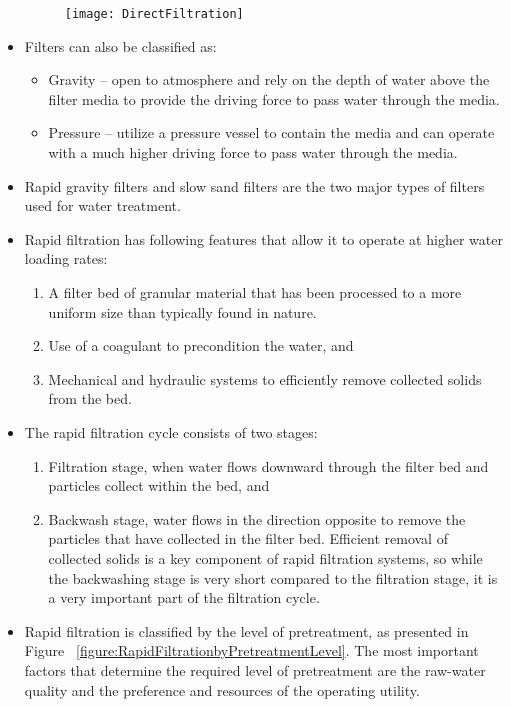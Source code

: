 \begin{itemize}
\begin{figure}[H]
\begin{center}
\texttt{[image: DirectFiltration]}\\
\label{Direct filtration}
\end{center}
\end{figure}
\item Filters can also be classified as:
\begin{itemize}
\item Gravity – open to atmosphere and rely on the depth of water above the filter media to provide
the driving force to pass water through the media.
\item Pressure – utilize a pressure vessel to contain the media and can operate with a much higher driving force to pass water through the media.
\end{itemize}
\item Rapid gravity filters and slow sand filters are the two major types of filters used for water treatment.

\item Rapid filtration has following features that allow it to operate at higher water loading rates:
\begin{enumerate}
\item A filter bed of granular material that has been processed to a more uniform size than typically found in nature.
\item Use of a coagulant to precondition the water, and
\item Mechanical and hydraulic systems to efficiently remove collected solids from the bed.
\end{enumerate}
\item The rapid filtration
cycle consists of two stages: 
\begin{enumerate}
\item Filtration stage, when water flows downward through the filter bed and particles collect within the bed, and 
\item Backwash stage, water flows in the direction opposite to remove the particles that have collected in the filter bed. Efficient removal of collected solids is a key component of rapid filtration systems, so while the backwashing stage is very short compared to the filtration stage, it is a very important part of the filtration cycle.
\end{enumerate}

\item Rapid filtration is classified by the level of pretreatment, as presented in Figure ~\ref{figure:RapidFiltrationbyPretreatmentLevel}. The most important factors that determine the required level of pretreatment are the raw-water quality and the preference and resources of the operating utility.


\end{itemize}
